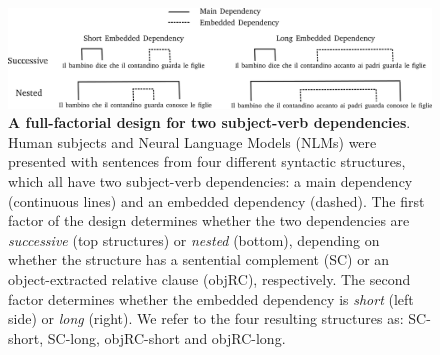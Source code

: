 \begin{figure}
    \centering
    \includegraphics[width=\textwidth]{figures/design.png}
    \caption{\textbf{A full-factorial design for two subject-verb dependencies}. Human subjects and Neural Language Models (NLMs) were presented with sentences from four different syntactic structures, which all have two subject-verb dependencies: a main dependency (continuous lines) and an embedded dependency (dashed). The first factor of the design determines whether the two dependencies are \textit{successive} (top structures) or \textit{nested} (bottom), depending on whether the structure has a sentential complement (SC) or an object-extracted relative clause (objRC), respectively. The second factor determines whether the embedded dependency is \textit{short} (left side) or \textit{long} (right). We refer to the four resulting structures as: SC-short, SC-long, objRC-short and objRC-long.}
    \label{fig:design}
\end{figure}
